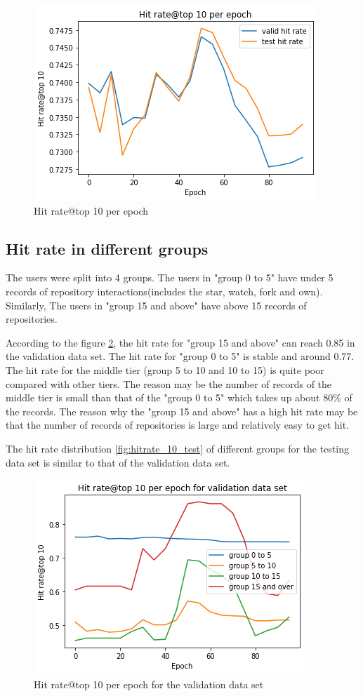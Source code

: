 \documentclass[11pt,twoside]{report}
\begin{document}
\begin{figure}[H]
    \centering
    \includegraphics[scale=0.9]{hitrate@10.png}
    \caption{Hit rate@top 10 per epoch}
    \label{fig:hitrate_10}
\end{figure}

\subsection{Hit rate in different groups}
The users were split into 4 groups. The users in "group 0 to 5" have under 5 records of repository interactions(includes the star, watch, fork and own). Similarly, The users in "group 15 and above" have above 15 records of repositories.

According to the figure \ref{fig:hitrate_10_valid}, the hit rate for "group 15 and above" can reach 0.85 in the validation data set. The hit rate for "group 0 to 5" is stable and around 0.77. The hit rate for the middle tier (group 5 to 10 and 10 to 15) is quite poor compared with other tiers. The reason may be the number of records of the middle tier is small than that of the "group 0 to 5" which takes up about 80\% of the records. The reason why the "group 15 and above" has a high hit rate may be that the number of records of repositories is large and relatively easy to get hit.

The hit rate distribution \ref{fig:hitrate_10_test} of different groups for the testing data set is similar to that of the validation data set.

\begin{figure}[H]
    \centering
    \includegraphics[scale=0.9]{hitrate@10_valid.png}
    \caption{Hit rate@top 10 per epoch for the validation data set}
    \label{fig:hitrate_10_valid}
\end{figure}
\end{document}
